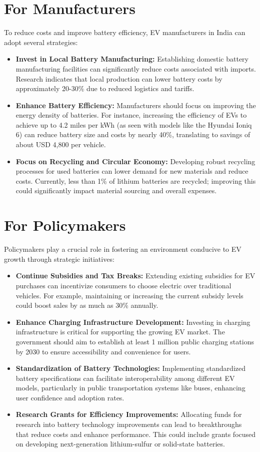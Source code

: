 \documentclass[a4paper,12pt]{report}
\begin{document}
\section{For Manufacturers}
To reduce costs and improve battery efficiency, EV manufacturers in India can adopt several strategies:
\begin{itemize}
    \item \textbf{Invest in Local Battery Manufacturing: }
    Establishing domestic battery manufacturing facilities can significantly reduce costs associated with imports. Research indicates that local production can lower battery costs by approximately 20-30\% due to reduced logistics and tariffs.\cite{icrier}
    \item \textbf{Enhance Battery Efficiency: }
    Manufacturers should focus on improving the energy density of batteries. For instance, increasing the efficiency of EVs to achieve up to 4.2 miles per kWh (as seen with models like the Hyundai Ioniq 6) can reduce battery size and costs by nearly 40\%, translating to savings of about USD 4,800 per vehicle.
    \item \textbf{Focus on Recycling and Circular Economy: }
    Developing robust recycling processes for used batteries can lower demand for new materials and reduce costs. Currently, less than 1\% of lithium batteries are recycled; improving this could significantly impact material sourcing and overall expenses.
\end{itemize}


\section{For Policymakers}
Policymakers play a crucial role in fostering an environment conducive to EV growth through strategic initiatives:
\begin{itemize}
    \item \textbf{Continue Subsidies and Tax Breaks: }
    Extending existing subsidies for EV purchases can incentivize consumers to choose electric over traditional vehicles. For example, maintaining or increasing the current subsidy levels could boost sales by as much as 30\% annually.
    \item \textbf{Enhance Charging Infrastructure Development: }
    Investing in charging infrastructure is critical for supporting the growing EV market. The government should aim to establish at least 1 million public charging stations by 2030 to ensure accessibility and convenience for users.
    \item \textbf{Standardization of Battery Technologies: }
    Implementing standardized battery specifications can facilitate interoperability among different EV models, particularly in public transportation systems like buses, enhancing user confidence and adoption rates.
    \item \textbf{Research Grants for Efficiency Improvements: }
    Allocating funds for research into battery technology improvements can lead to breakthroughs that reduce costs and enhance performance. This could include grants focused on developing next-generation lithium-sulfur or solid-state batteries.
\end{itemize}
\end{document}
